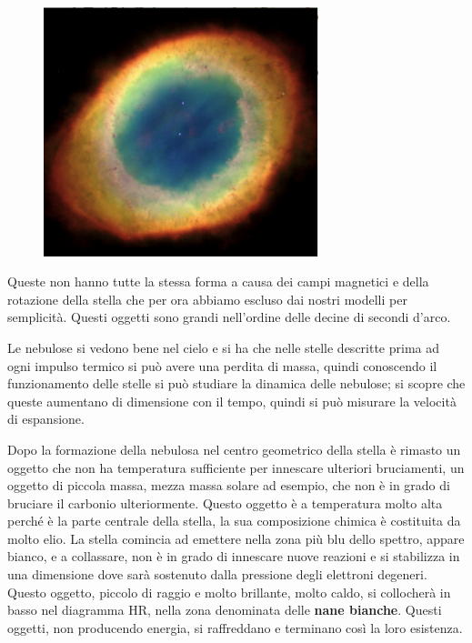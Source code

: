 \begin{figure}[H]
    \centering
    \includegraphics[width=8cm]{Osservazione di nebulosa stellare.png}
    \label{fig:Osservazione di nebulosa stellare.png}
\end{figure}

Queste non hanno tutte la stessa forma a causa dei campi magnetici e della rotazione della stella che per ora abbiamo escluso dai nostri modelli per semplicità. Questi oggetti sono grandi nell'ordine delle decine di secondi d'arco.

Le nebulose si vedono bene nel cielo e si ha che nelle stelle descritte prima ad ogni impulso termico si può avere una perdita di massa, quindi conoscendo il funzionamento delle stelle si può studiare la dinamica delle nebulose; si scopre che queste aumentano di dimensione con il tempo, quindi si può misurare la velocità di espansione.

Dopo la formazione della nebulosa nel centro geometrico della stella è rimasto un oggetto che non ha temperatura sufficiente per innescare ulteriori bruciamenti, un oggetto di piccola massa, mezza massa solare ad esempio, che non è in grado di bruciare il carbonio ulteriormente. Questo oggetto è a temperatura molto alta perché è la parte centrale della stella, la sua composizione chimica è costituita da molto elio. La stella comincia ad emettere nella zona più blu dello spettro, appare bianco, e a collassare, non è in grado di innescare nuove reazioni e si stabilizza in una dimensione dove sarà sostenuto dalla pressione degli elettroni degeneri. Questo oggetto, piccolo di raggio e molto brillante, molto caldo, si collocherà in basso nel diagramma HR, nella zona denominata delle \textbf{nane bianche}. Questi oggetti, non producendo energia, si raffreddano e terminano così la loro esistenza.

